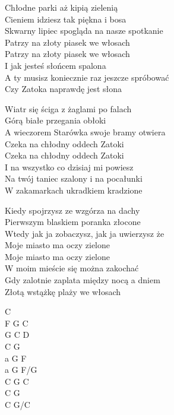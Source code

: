 \begin{text}
    Chłodne parki aż kipią zielenią\\
    Cieniem idziesz tak piękna i bosa\\
    Skwarny lipiec spogląda na nasze spotkanie\\
    Patrzy na złoty piasek we włosach\\
    Patrzy na złoty piasek we włosach\\
    I jak jesteś słońcem spalona\\
    A ty musisz koniecznie raz jeszcze spróbować\\
    Czy Zatoka naprawdę jest słona

    Wiatr się ściga z żaglami po falach\\
    Górą białe przegania obłoki\\
    A wieczorem Starówka swoje bramy otwiera\\
    Czeka na chłodny oddech Zatoki\\
    Czeka na chłodny oddech Zatoki\\
    I na wszystko co dzisiaj mi powiesz\\
    Na twój taniec szalony i na pocałunki\\
    W zakamarkach ukradkiem kradzione

    Kiedy spojrzysz ze wzgórza na dachy\\
    Pierwszym blaskiem poranka złocone\\
    Wtedy jak ja zobaczysz, jak ja uwierzysz że\\
    Moje miasto ma oczy zielone\\
    Moje miasto ma oczy zielone\\
    W moim mieście się można zakochać\\
    Gdy zalotnie zaplata między nocą a dniem\\
    Złotą wstążkę plaży we włosach
\end{text}
\begin{chord}
    C\\
    F G C\\
    G C D\\
    C G\\
    a G F\\
    a G F/G\\
    C G C\\
    C G\\
    C G/C
\end{chord}